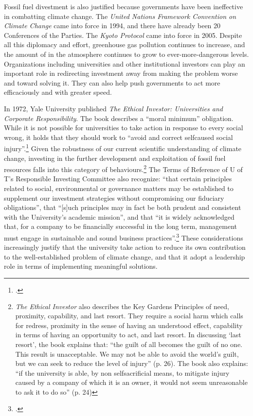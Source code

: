 Fossil fuel divestment is also justified because governments have been ineffective in combatting climate change.
The \emph{United Nations Framework Convention on Climate Change} came into force in 1994, and there have already been 20 Conferences of the Parties.
The \emph{Kyoto Protocol} came into force in 2005.
Despite all this diplomacy and effort, greenhouse gas pollution continues to increase, and the amount of  in the atmosphere continues to grow to ever-more-dangerous levels.
Organizations including universities and other institutional investors can play an important role in redirecting investment away from making the problem worse and toward solving it.
They can also help push governments to act more efficaciously and with greater speed.



In 1972, Yale University published \emph{The Ethical Investor: Universities and Corporate Responsibility}.
The book describes a ``moral minimum'' obligation.
While it is not possible for universities to take action in response to every social wrong, it holds that they should work to ``avoid and correct self­caused social injury''.\footcite[][p. 21]{EthicalInvestor}
Given the robustness of our current scientific understanding of climate change, investing in the further development and exploitation of fossil fuel resources falls into this category of behaviours.\footnote{\emph{The Ethical Investor} also describes the Key Gardens Principles of need, proximity, capability, and last resort. They require a social harm which calls for redress, proximity in the sense of having an understood effect, capability in terms of having an opportunity to act, and last resort. In discussing `last resort', the book explains that: ``the guilt of all becomes the guilt of no one. This result is unacceptable. We may not be able to avoid the world's guilt, but we can seek to reduce the level of injury'' (p. 26). The book also explains: ``if the university is able, by non self­sacrificial means, to mitigate injury caused by a company of which it is an owner, it would not seem unreasonable to ask it to do so'' (p. 24)}
The Terms of Reference of U of T's Responsible Investing Committee also recognize: ``that certain principles related to social, environmental or governance matters may be established to supplement our investment strategies without compromising our fiduciary obligations'', that ``[s]uch principles may in fact be both prudent and consistent with the University's academic mission'', and that ``it is widely acknowledged that, for a company to be financially successful in the long term, management must engage in sustainable and sound business practices''.\footcite[][]{UTRICTOR}
These considerations increasingly justify that the university take action to reduce its own contribution to the well-established problem of climate change, and that it adopt a leadership role in terms of implementing meaningful solutions.



